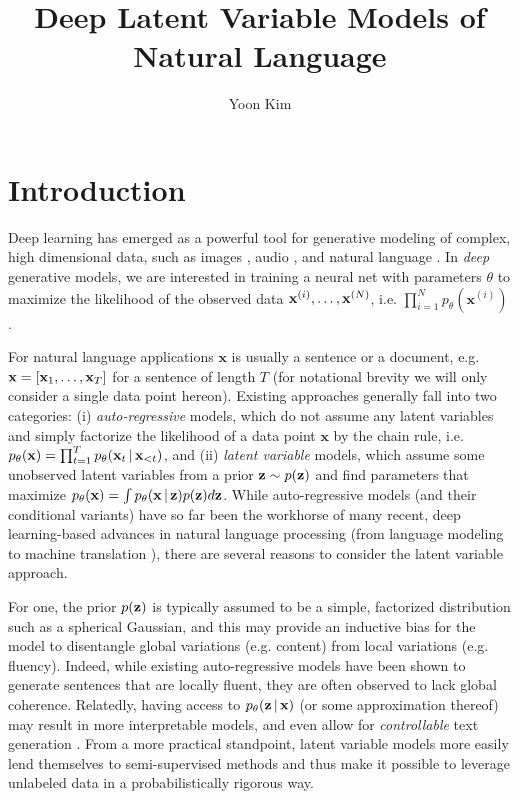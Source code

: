 \documentclass{article}
\begin{document}
\title{\vspace{-15mm} \Large Deep Latent Variable Models of Natural Language \vspace{-5mm}} 
\author{Yoon Kim}
\date{}
\maketitle
\vspace{-16mm}
\section{Introduction}
\vspace{-4mm}
Deep learning has emerged as a powerful tool for generative modeling of complex, high dimensional data, such as images \cite{goodfellow2014generative,Radford2016,pixelrnn}, audio \cite{wavenet}, and natural language \cite{Mikolov2010}. In \emph{deep} generative models, we are interested in training a neural net with parameters $\theta$ to maximize the likelihood of the observed data $\mathbf{x}^{(i)}, \dots, \mathbf{x}^{(N)}$, i.e. $\prod_{i=1}^N p_\theta (\mathbf{x}^{(i)})$.

For natural language applications $\mathbf{x}$ is usually a sentence 
or a document, e.g. $\mathbf{x} = [\mathbf{x}_1, \dots, \mathbf{x}_T]$
for a sentence of length $T$ (for notational brevity we will only consider a single data point hereon).
Existing approaches generally fall into two categories: (i) \emph{auto-regressive} models, which do not assume any latent variables and simply factorize
the likelihood of a data point $\mathbf{x}$  by the chain rule, i.e.
$ p_\theta(\mathbf{x}) = \prod_{t=1}^T p_\theta(\mathbf{x}_t \,|\, \mathbf{x}_{<t})$,
and (ii) \emph{latent variable} models, which assume 
some unobserved latent variables from a prior
$\mathbf{z} \sim p(\mathbf{z})$ and find parameters that maximize $p_\theta(\mathbf{x}) = \int p_\theta(\mathbf{x} \,|\, \mathbf{z}) p(\mathbf{z}) d\mathbf{z}$.
While auto-regressive models (and their conditional variants) have so far been the workhorse of many recent, deep learning-based advances in natural language processing (from language modeling \cite{Mikolov2010} to machine translation \cite{Sutskever2014,Cho2014}),
there are several reasons to consider the latent variable approach.

For one, the prior $p(\mathbf{z})$ is typically assumed to be a simple, factorized
distribution such as a spherical Gaussian, and this may provide an
inductive bias for the model
to disentangle global variations (e.g. content) from local variations (e.g.
fluency). Indeed, while existing auto-regressive models have been shown to generate sentences that are locally fluent, they are often observed to lack global coherence. Relatedly, having access to $p_\theta(\mathbf{z} \,|\, \mathbf{x})$ (or some approximation thereof) may result in more interpretable models, and even allow for \emph{controllable} text generation \cite{Hu2017}.
From a more practical standpoint, latent variable models more easily lend themselves to semi-supervised methods and thus make it possible to leverage unlabeled data in a probabilistically rigorous way.
\end{document}
